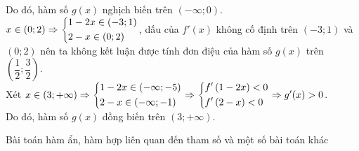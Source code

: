 \begin{ex}
{		Do đó, hàm số $g(x)$ nghịch biến trên $\left(-\infty ;0\right)$.\\
		$x\in\left(0;2\right)\Rightarrow \left\{\begin{aligned}
			& 1-2x\in\left(-3;1\right)\\ 
			& 2-x\in\left(0;2\right)\end{aligned}\right.$, dấu của $f'(x)$ không cố định trên $\left(-3;1\right)$ và $\left(0;2\right)$ nên ta không kết luận được tính đơn điệu của hàm số $g(x)$ trên $\left(\dfrac{1}{2};\dfrac{3}{2}\right)$.\\
		Xét $x\in\left(3;+\infty\right)\Rightarrow \left\{\begin{aligned}
			& 1-2x\in\left(-\infty ;-5\right)\\ 
			& 2-x\in\left(-\infty ;-1\right)\end{aligned}\right. \Rightarrow \left\{\begin{aligned}
			& f'\left(1-2x\right)<0\\ 
			& f'\left(2-x\right)<0\end{aligned}\right. \Rightarrow g'(x)>0$. \\
		Do đó, hàm số $g(x)$ đồng biến trên $\left(3;+\infty\right)$.}
\end{ex}

\begin{dang}{Bài toán hàm ẩn, hàm hợp liên quan đến tham số và một số bài toán khác}
\end{dang}

